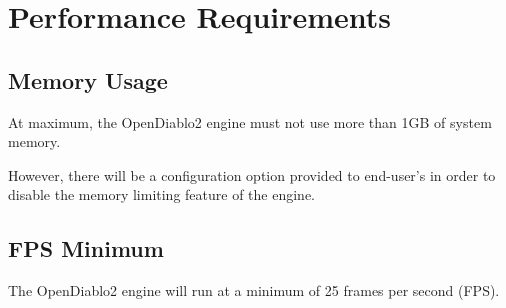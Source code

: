 \section{Performance Requirements} \label{sec:performance_requirements}


\subsection{Memory Usage}
At maximum, the OpenDiablo2 engine must not use more than 1GB of system memory.

However, there will be a configuration option provided to end-user's in order to disable the memory limiting feature of the engine.

\subsection{FPS Minimum}
The OpenDiablo2 engine will run at a minimum of 25 frames per second (FPS).
